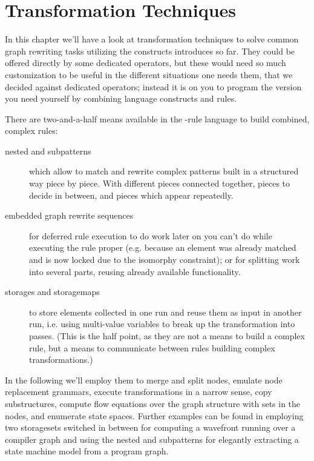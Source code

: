 \chapter{Transformation Techniques}
\label{cha:techniques}
\label{sub:mergesplit}

In this chapter we'll have a look at transformation techniques to solve common graph rewriting tasks utilizing the constructs introduces so far.
They could be offered directly by some dedicated operators,
but these would need so much customization to be useful in the different situations one needs them,
that we decided against dedicated operators;
instead it is on you to program the version you need yourself by combining language constructs and rules.


There are two-and-a-half means available in the \GrG-rule language to build combined, complex rules:
\begin{description}
	\item[nested and subpatterns]
which allow to match and rewrite complex patterns built in a structured way piece by piece.
With different pieces connected together, pieces to decide in between, and pieces which appear repeatedly.
	\item[embedded graph rewrite sequences]
for deferred rule execution to do work later on you can't do while executing the rule proper (e.g. because an element was already matched and is now locked due to the isomorphy constraint); or for splitting work into several parts, reusing already available functionality.
	\item[storages and storagemaps]
to store elements collected in one run and reuse them as input in another run, i.e. using multi-value variables to break up the transformation into passes. (This is the half point, as they are not a means to build a complex rule, but a means to communicate between rules building complex transformations.)
\end{description}

\noindent In the following we'll employ them to merge and split nodes, emulate node replacement grammars, execute transformations in a narrow sense, copy substructures, compute flow equations over the graph structure with sets in the nodes, and enumerate state spaces.
Further examples can be found in \cite{CompilerOptimization} employing two storagesets switched in between for computing a wavefront running over a compiler graph and \cite{ProgramUnderstanding} using the nested and subpatterns for elegantly extracting a state machine model from a program graph.

